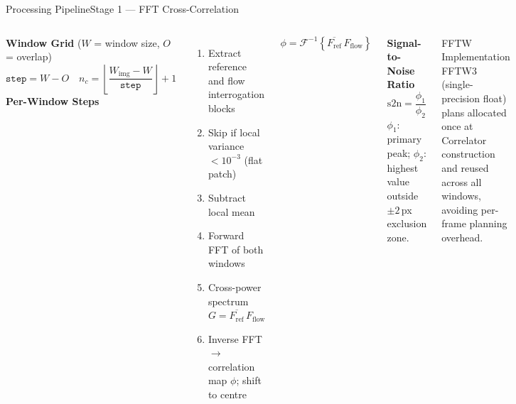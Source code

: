 \documentclass[9pt, aspectratio=169]{beamer}
\newcommand{\code}[1]{{\ttfamily\color{accent!85!black}#1}}
\begin{document}
\begin{frame}{Processing Pipeline}{Stage 1 --- FFT Cross-Correlation}
  \begin{columns}[t]
    
    \begin{minipage}[t][\columnheight][t]{\linewidth}
    \vspace{-2cm}
      \textbf{Window Grid} \;($W$ = window size, $O$ = overlap)
      \[
        \texttt{step} =  W - O \quad
        n_c = \left\lfloor\frac{W_\mathrm{img}-W}{\texttt{step}}\right\rfloor+1
      \]
      \textbf{Per-Window Steps}
      \begin{enumerate}
        \small
        \item Extract reference and flow interrogation blocks
        \item Skip if local variance $< 10^{-3}$ (flat patch)
        \item Subtract local mean
        \item Forward FFT of both windows
        \item Cross-power spectrum $G = \overline{F_\mathrm{ref}}\,F_\mathrm{flow}$
        \item Inverse FFT $\to$ correlation map $\phi$; shift to centre
      \end{enumerate}
      \[
        \phi = \mathcal{F}^{-1}\!\left\{\overline{F_{\mathrm{ref}}}\,F_{\mathrm{flow}}\right\}
      \]
    \end{minipage}
    \begin{minipage}[t][\columnheight][t]{\linewidth}
    \vspace{-1.5cm}
      \textbf{Signal-to-Noise Ratio}
      \[
        \mathrm{s2n} = \frac{\phi_1}{\phi_2}
      \]
      \small $\phi_1$: primary peak; \;$\phi_2$: highest value outside $\pm2$\,px exclusion zone.

      \vspace{0.4em}
      \begin{block}{FFTW Implementation}
        FFTW3 (single-precision float) plans allocated once at \code{Correlator} construction and reused across all windows, avoiding per-frame planning overhead.
      \end{block}
    \end{minipage}
  \end{columns}
\end{frame}
\end{document}
